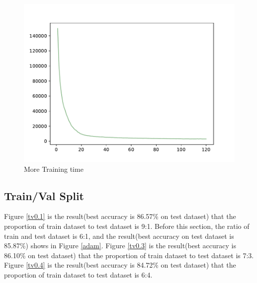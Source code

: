\documentclass{article}
\begin{document}
\begin{figure}[!h]
{\begin{minipage}{0.21\linewidth}
  \includegraphics[scale=0.23]{imgs/test_loss_fit.pdf}
  \end{minipage}
}
\quad
{}
\caption{More Training time}
\label{over}
\end{figure}

\subsection{Train/Val Split}
Figure \ref{tv0.1} is the result(best accuracy is 86.57\% on test dataset) that the proportion of train dataset to test dataset is 9:1. Before this section, the ratio of train and test dataset is 6:1, and the result(best accuracy on test dataset is 85.87\%) shows in Figure \ref{adam}. Figure \ref{tv0.3} is the result(best accuracy is 86.10\% on test dataset) that the proportion of train dataset to test dataset is 7:3.   Figure \ref{tv0.4} is the result(best accuracy is 84.72\% on test dataset) that the proportion of train dataset to test dataset is 6:4. 
\end{document}
